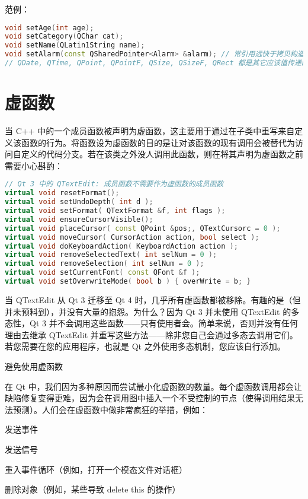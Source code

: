 范例：

\begin{lstlisting}[language=C++]
void setAge(int age);
void setCategory(QChar cat);
void setName(QLatin1String name);
void setAlarm(const QSharedPointer<Alarm> &alarm); // 常引用远快于拷贝构造和析构
// QDate, QTime, QPoint, QPointF, QSize, QSizeF, QRect 都是其它应该值传递的好例子
\end{lstlisting}

\section{虚函数}

当 C++ 中的一个成员函数被声明为虚函数，这主要用于通过在子类中重写来自定义该函数的行为。将函数设为虚函数的目的是让对该函数的现有调用会被替代为访问自定义的代码分支。若在该类之外没人调用此函数，则在将其声明为虚函数之前需要小心斟酌：

\begin{lstlisting}[language=C++]
// Qt 3 中的 QTextEdit: 成员函数不需要作为虚函数的成员函数
virtual void resetFormat();
virtual void setUndoDepth( int d );
virtual void setFormat( QTextFormat &f, int flags );
virtual void ensureCursorVisible();
virtual void placeCursor( const QPoint &pos;, QTextCursorc = 0 );
virtual void moveCursor( CursorAction action, bool select );
virtual void doKeyboardAction( KeyboardAction action );
virtual void removeSelectedText( int selNum = 0 );
virtual void removeSelection( int selNum = 0 );
virtual void setCurrentFont( const QFont &f );
virtual void setOverwriteMode( bool b ) { overWrite = b; }
\end{lstlisting}

当 QTextEdit 从 Qt 3 迁移至 Qt 4 时，几乎所有虚函数都被移除。有趣的是（但并未预料到），并没有大量的抱怨。为什么？因为 Qt 3 并未使用 QTextEdit 的多态性，Qt 3 并不会调用这些函数——只有使用者会。简单来说，否则并没有任何理由去继承 QTextEdit 并重写这些方法——除非您自己会通过多态去调用它们。若您需要在您的应用程序，也就是 Qt 之外使用多态机制，您应该自行添加。

避免使用虚函数

在 Qt 中，我们因为多种原因而尝试最小化虚函数的数量。每个虚函数调用都会让缺陷修复变得更难，因为会在调用图中插入一个不受控制的节点（使得调用结果无法预测）。人们会在虚函数中做非常疯狂的举措，例如：

\begin{compactitem}
\item 发送事件
\item 发送信号
\item 重入事件循环（例如，打开一个模态文件对话框）
\item 删除对象（例如，某些导致 delete this 的操作）
\end{compactitem}

